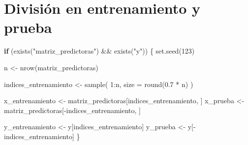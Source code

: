 \documentclass[
  11pt,
  letterpaper,
]{book}
\newenvironment{Shaded}{\begin{snugshade}}{\end{snugshade}}
\newcommand{\AttributeTok}[1]{\textcolor[rgb]{0.40,0.45,0.13}{#1}}
\newcommand{\ControlFlowTok}[1]{\textcolor[rgb]{0.00,0.23,0.31}{\textbf{#1}}}
\newcommand{\DecValTok}[1]{\textcolor[rgb]{0.68,0.00,0.00}{#1}}
\newcommand{\FloatTok}[1]{\textcolor[rgb]{0.68,0.00,0.00}{#1}}
\newcommand{\FunctionTok}[1]{\textcolor[rgb]{0.28,0.35,0.67}{#1}}
\newcommand{\NormalTok}[1]{\textcolor[rgb]{0.00,0.23,0.31}{#1}}
\newcommand{\OtherTok}[1]{\textcolor[rgb]{0.00,0.23,0.31}{#1}}
\newcommand{\SpecialCharTok}[1]{\textcolor[rgb]{0.37,0.37,0.37}{#1}}
\newcommand{\StringTok}[1]{\textcolor[rgb]{0.13,0.47,0.30}{#1}}
\begin{document}
\begin{Shaded}
\end{Shaded}

\section{División en entrenamiento y
prueba}\label{divisiuxf3n-en-entrenamiento-y-prueba-1}

\begin{Shaded}
\begin{Highlighting}[]
\ControlFlowTok{if}\NormalTok{ (}\FunctionTok{exists}\NormalTok{(}\StringTok{"matriz\_predictoras"}\NormalTok{) }\SpecialCharTok{\&\&} \FunctionTok{exists}\NormalTok{(}\StringTok{"y"}\NormalTok{)) \{}
  \FunctionTok{set.seed}\NormalTok{(}\DecValTok{123}\NormalTok{)}

\NormalTok{  n }\OtherTok{\textless{}{-}} \FunctionTok{nrow}\NormalTok{(matriz\_predictoras)}

\NormalTok{  indices\_entrenamiento }\OtherTok{\textless{}{-}} \FunctionTok{sample}\NormalTok{(}
    \DecValTok{1}\SpecialCharTok{:}\NormalTok{n,}
    \AttributeTok{size =} \FunctionTok{round}\NormalTok{(}\FloatTok{0.7} \SpecialCharTok{*}\NormalTok{ n)}
\NormalTok{  )}

\NormalTok{  x\_entrenamiento }\OtherTok{\textless{}{-}}\NormalTok{ matriz\_predictoras[indices\_entrenamiento, ]}
\NormalTok{  x\_prueba }\OtherTok{\textless{}{-}}\NormalTok{ matriz\_predictoras[}\SpecialCharTok{{-}}\NormalTok{indices\_entrenamiento, ]}

\NormalTok{  y\_entrenamiento }\OtherTok{\textless{}{-}}\NormalTok{ y[indices\_entrenamiento]}
\NormalTok{  y\_prueba }\OtherTok{\textless{}{-}}\NormalTok{ y[}\SpecialCharTok{{-}}\NormalTok{indices\_entrenamiento]}
\NormalTok{\}}
\end{Highlighting}
\end{Shaded}
\end{document}
